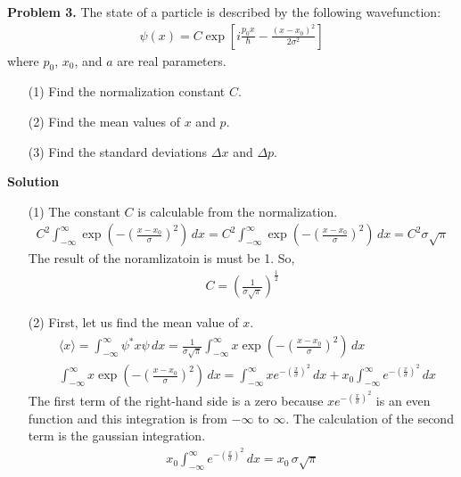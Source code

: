 \documentclass[floatfix,nofootinbib,superscriptaddress,fleqn]{revtex4}
\begin{document}
\noindent \textbf{Problem 3.} 
The state of a particle is described by the following wavefunction:
\begin{align*}
\psi(x) = C\exp\left[
i\frac{p_0 x}{\hbar} - \frac{(x-x_0)^2}{2\sigma^2} 
\right]
\end{align*}
where $p_0$, $x_0$, and $a$ are real parameters. 
\begin{itemize}
\item[(1)] Find the normalization constant $C$.
\item[(2)] Find the mean values of $x$ and $p$.
\item[(3)] Find the standard deviations $\Delta x$ and $\Delta p$.
\end{itemize}
\noindent \textbf{Solution}
\begin{itemize}
  \item[(1)] The constant $C$ is calculable from the normalization.
  \begin{align}
    C^2\int_{-\infty}^{\infty} 
    \exp\left(-{\left(\frac{x-x_0}{\sigma} \right)}^2\right)\,dx 
    = C^2\int_{-\infty}^{\infty}
    \exp\left(-{\left(\frac{x-x_0}{\sigma} \right)}^2\right)\,dx 
    = C^2\sigma \sqrt{\pi}
  \end{align}
The result of the noramlizatoin is must be 1. So,
  \begin{align}
    C = {\left(\frac{1}{\sigma \sqrt{\pi}}\right)}^{\frac{1}{2}}
  \end{align}
\item[(2)]First, let us find the mean value of $x$.
  \begin{align}
    &\langle x \rangle=\int_{-\infty}^{\infty}\psi^*x\psi\,dx 
      = \frac{1}{\sigma\sqrt{\pi}}\int_{-\infty}^{\infty} x 
      \exp\left(-{\left( \frac{x-x_0}{\sigma} \right)}^2\right)\,dx \\
    &\int_{-\infty}^{\infty} x 
    \exp\left(-{\left(\frac{x-x_0}{\sigma} \right)}^2\right)\,dx 
      = \int_{-\infty}^{\infty} x 
      e^{-{\left(\frac{x}{\sigma}\right)}^2}\,dx 
      +x_0\int_{-\infty}^{\infty} 
      e^{-{\left(\frac{x}{\sigma}\right)}^2}\,dx
  \end{align}
The first term of the right-hand side is a zero 
because $x e^{-{\left(\frac{x}{\sigma}\right)}^2}$ 
is an even function and this integration is from $-\infty$ to $\infty$. 
The calculation of the second term is the gaussian integration.
  \begin{align}
    x_0\int_{-\infty}^{\infty} e^{-{\left(\frac{x}{\sigma}\right)}^2}\,dx 
    = x_0\,\sigma\sqrt{\pi}
  \end{align}

\end{itemize}
\end{document}
